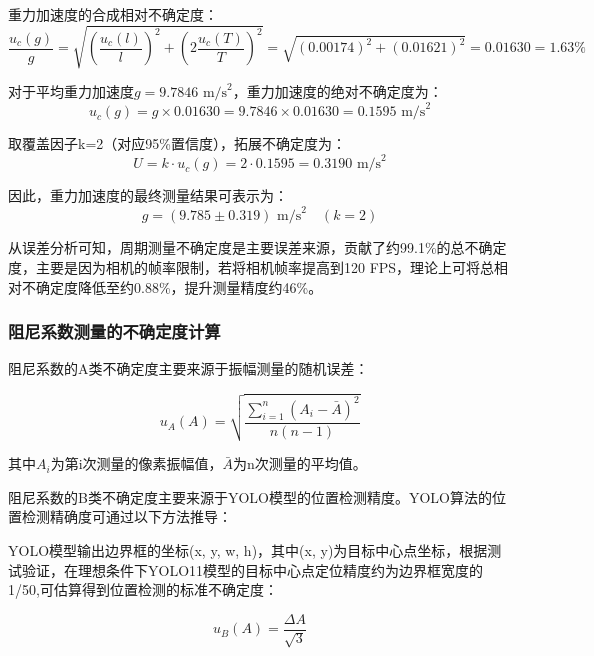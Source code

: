 \begin{enumerate}[leftmargin=*]
重力加速度的合成相对不确定度：
\begin{equation}
\frac{u_c(g)}{g} = \sqrt{\left(\frac{u_c(l)}{l}\right)^2 + \left(2\frac{u_c(T)}{T}\right)^2} = \sqrt{(0.00174)^2 + (0.01621)^2} = 0.01630 = 1.63\%
\end{equation}

对于平均重力加速度$g = 9.7846 \text{ m/s}^2$，重力加速度的绝对不确定度为：
\begin{equation}
u_c(g) = g \times 0.01630 = 9.7846 \times 0.01630 = 0.1595\text{ m/s}^2
\end{equation}

取覆盖因子k=2（对应95\%置信度），拓展不确定度为：
\begin{equation}
U = k \cdot u_c(g) = 2 \cdot 0.1595 = 0.3190\text{ m/s}^2
\end{equation}

因此，重力加速度的最终测量结果可表示为：
\begin{equation}
g = (9.785 \pm 0.319)\text{ m/s}^2 \quad (k=2)
\end{equation}
\end{enumerate}

从误差分析可知，周期测量不确定度是主要误差来源，贡献了约99.1\%的总不确定度，主要是因为相机的帧率限制，若将相机帧率提高到120 FPS，理论上可将总相对不确定度降低至约0.88\%，提升测量精度约46\%。

\subsubsection{阻尼系数测量的不确定度计算}

阻尼系数的A类不确定度主要来源于振幅测量的随机误差：

\begin{equation}
u_A(A) = \sqrt{\frac{\sum_{i=1}^{n}(A_i-\bar{A})^2}{n(n-1)}}
\end{equation}

其中$A_i$为第i次测量的像素振幅值，$\bar{A}$为n次测量的平均值。


阻尼系数的B类不确定度主要来源于YOLO模型的位置检测精度。YOLO算法的位置检测精确度可通过以下方法推导：

YOLO模型输出边界框的坐标(x, y, w, h)，其中(x, y)为目标中心点坐标，根据测试验证，在理想条件下YOLO11模型的目标中心点定位精度约为边界框宽度的1/50,可估算得到位置检测的标准不确定度：

\begin{equation}
u_B(A) = \frac{\Delta A}{\sqrt{3}}
\end{equation}

